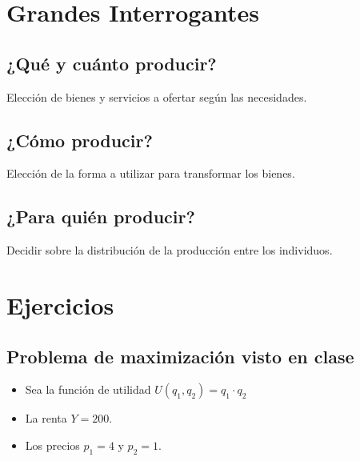 \documentclass{templateNote}
\begin{document}
\section{Grandes Interrogantes}
\subsection{¿Qué y cuánto producir?}
\indent
Elección de bienes y servicios a ofertar según las necesidades.

\subsection{¿Cómo producir?}
\indent
Elección de la forma a utilizar para transformar los bienes.

\subsection{¿Para quién producir?}
\indent
Decidir sobre la distribución de la producción entre los individuos.

\newpage
\section{Ejercicios}
\subsection{Problema de maximización visto en clase}
\begin{itemize}
    \item Sea la función de utilidad $U(q_1,q_2) = q_1 \cdot q_2$
    \item La renta $Y = 200$.
    \item Los precios $p_1 = 4$ y $p_2 = 1$.
\end{itemize}
\end{document}
